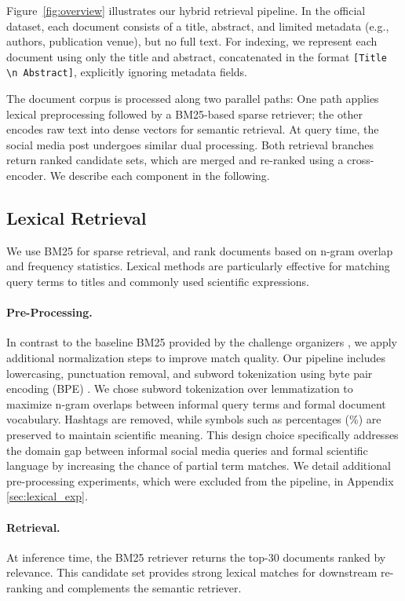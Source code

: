 %
%
Figure~\ref{fig:overview} illustrates our hybrid retrieval pipeline. In the official dataset, each document consists of a title, abstract, and limited metadata (e.g., authors, publication venue), but no full text. For indexing, we represent each document using only the title and abstract, concatenated in the format \texttt{[{Title} \textbackslash n {Abstract}]}, explicitly ignoring metadata fields.

The document corpus is processed along two parallel paths: One path applies lexical preprocessing followed by a BM25-based sparse retriever; the other encodes raw text into dense vectors for semantic retrieval. At query time, the social media post undergoes similar dual processing. Both retrieval branches return ranked candidate sets, which are merged and re-ranked using a cross-encoder. We describe each component in the following.


\subsection{Lexical Retrieval} \label{sec:lexical}
We use BM25 \cite{robertson_relevance_1976, robertson_probabilistic_2009} for sparse retrieval, and rank documents based on n-gram overlap and frequency statistics. Lexical methods are particularly effective for matching query terms to titles and commonly used scientific expressions.

\paragraph{Pre-Processing.}
In contrast to the baseline BM25 provided by the challenge organizers \cite{clef-checkthat:2025:task4}, we apply additional normalization steps to improve match quality. Our pipeline includes lowercasing, punctuation removal, and subword tokenization using byte pair encoding (BPE) \cite{sennrich_neural_2016}. We chose subword tokenization over lemmatization to maximize n-gram overlaps between informal query terms and formal document vocabulary. Hashtags are removed, while symbols such as percentages (\%) are preserved to maintain scientific meaning.
This design choice specifically addresses the domain gap between informal social media queries and formal scientific language by increasing the chance of partial term matches.
We detail additional pre-processing experiments, which were excluded from the pipeline, in Appendix \ref{sec:lexical_exp}.

\paragraph{Retrieval.} At inference time, the BM25 retriever returns the top-$30$ documents ranked by relevance. This candidate set provides strong lexical matches for downstream re-ranking and complements the semantic retriever.


